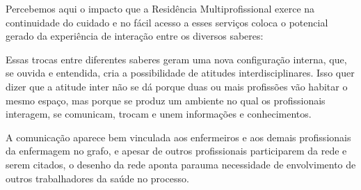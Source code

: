 Percebemos aqui o impacto que a Residência Multiprofissional exerce na continuidade do cuidado e no fácil acesso a esses serviços  coloca o potencial gerado da experiência de interação entre os diversos saberes:

Essas trocas entre diferentes saberes geram uma nova configuração interna, que, se ouvida e entendida, cria a possibilidade de atitudes interdisciplinares. Isso quer dizer que a atitude inter não se dá porque duas ou mais profissões vão habitar o mesmo espaço, mas porque se produz um ambiente no qual os profissionais interagem, se comunicam, trocam e unem informações e conhecimentos.

A comunicação aparece bem vinculada aos enfermeiros e aos demais profissionais da enfermagem no grafo, e apesar de outros profissionais participarem da rede e serem citados, o desenho da rede aponta parauma necessidade de envolvimento de outros trabalhadores da saúde no processo.